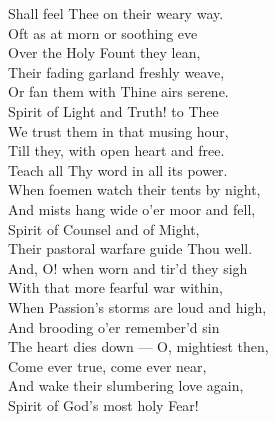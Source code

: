  Shall feel Thee on their weary way. \\
  Oft as at morn or soothing eve \\
 Over the Holy Fount they lean, \\
 Their fading garland freshly weave, \\
 Or fan them with Thine airs serene. \\
  Spirit of Light and Truth! to Thee \\
 We trust them in that musing hour, \\
 Till they, with open heart and free. \\
 Teach all Thy word in all its power. \\
  When foemen watch their tents by night, \\
 And mists hang wide o’er moor and fell, \\
 Spirit of Counsel and of Might, \\
 Their pastoral warfare guide Thou well. \\
  And, O! when worn and tir’d they sigh \\
 With that more fearful war within, \\
 When Passion’s storms are loud and high, \\
 And brooding o’er remember’d sin \\
  The heart dies down — O, mightiest then, \\
 Come ever true, come ever near, \\
 And wake their slumbering love again, \\
 Spirit of God’s most holy Fear! \\

